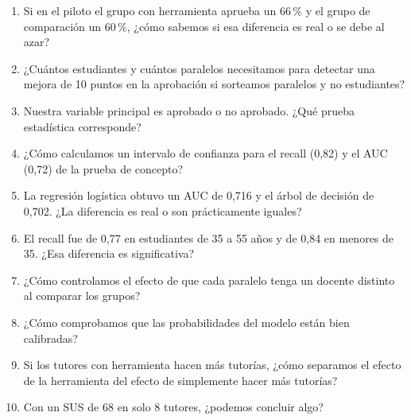 \documentclass[11pt]{article}
\begin{document}
\begin{enumerate}[leftmargin=1.5em]
\item Si en el piloto el grupo con herramienta aprueba un 66\,\% y el grupo de comparación un 60\,\%, ¿cómo sabemos si esa diferencia es real o se debe al azar?
\item ¿Cuántos estudiantes y cuántos paralelos necesitamos para detectar una mejora de 10 puntos en la aprobación si sorteamos paralelos y no estudiantes?
\item Nuestra variable principal es aprobado o no aprobado. ¿Qué prueba estadística corresponde?
\item ¿Cómo calculamos un intervalo de confianza para el recall (0,82) y el AUC (0,72) de la prueba de concepto?
\item La regresión logística obtuvo un AUC de 0,716 y el árbol de decisión de 0,702. ¿La diferencia es real o son prácticamente iguales?
\item El recall fue de 0,77 en estudiantes de 35 a 55 años y de 0,84 en menores de 35. ¿Esa diferencia es significativa?
\item ¿Cómo controlamos el efecto de que cada paralelo tenga un docente distinto al comparar los grupos?
\item ¿Cómo comprobamos que las probabilidades del modelo están bien calibradas?
\item Si los tutores con herramienta hacen más tutorías, ¿cómo separamos el efecto de la herramienta del efecto de simplemente hacer más tutorías?
\item Con un SUS de 68 en solo 8 tutores, ¿podemos concluir algo?
\end{enumerate}
\end{document}
